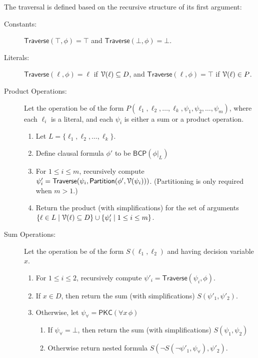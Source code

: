 \documentclass[letterpaper,USenglish,cleveref, autoref, thm-restate]{lipics-v2021}
\newcommand{\tautology}{\top}
\newcommand{\nil}{\bot}
\newcommand{\lit}{\ell}
\newcommand{\dvarset}{D}
\newcommand{\pvarset}{P}
\newcommand{\dependencyset}{{\cal V}}
\newcommand{\simplify}[2]{#1|_{#2}}
\newcommand{\ureduce}[2]{\forall #2\, #1}
\newcommand{\algo}[1]{\textsf{#1}}
\newcommand{\pkc}{\algo{PKC}}
\newcommand{\traverse}{\algo{Traverse}}
\newcommand{\bcp}{\algo{BCP}}
\newcommand{\partition}{\algo{Partition}}
\begin{document}
The traversal is defined based on the recursive structure of its first argument:
\begin{description}
\item[Constants:]
  $\traverse(\tautology, \phi) = \tautology$ and 
  $\traverse(\nil, \phi) = \nil$.

\item[Literals:]
  $\traverse(\lit, \phi) = \lit$ if $\dependencyset(\lit) \subseteq \dvarset$, and $\traverse(\lit, \phi) = \tautology$ if $\dependencyset(\lit) \in \pvarset$.
\item[Product Operations:]
  Let the operation be of the form $P(\lit_1, \lit_2, \ldots, \lit_k, \psi_1, \psi_2, \ldots, \psi_m)$, where each $\lit_i$ is a literal,
  and each $\psi_i$ is either a sum or a  product operation.
  \begin{enumerate}
  \item Let $L = \{\lit_1, \lit_2, \ldots, \lit_k\}$.
  \item Define clausal formula $\phi'$ to be $\bcp(\simplify{\phi}{L})$
  \item For $1 \leq i \leq m$, recursively compute $\psi'_i = \traverse(\psi_i, \partition(\phi', \dependencyset(\psi_i)))$.  (Partitioning is only required when $m > 1$.)
  \item Return the product (with simplifications) for the set of arguments $\{\lit \in L \mid  \dependencyset(\lit) \subseteq \dvarset\} \cup \{ \psi'_i \mid  1 \leq i \leq m \}$.
  \end{enumerate}
\item[Sum Operations:]
  Let the operation be of the form $S(\lit_1, \lit_2)$ and having decision variable $x$.
  \begin{enumerate}
  \item For $1 \leq i \leq 2$, recursively compute $\psi'_i = \traverse(\psi_i, \phi)$.
  \item If $x \in \dvarset$, then return the sum (with simplifications) $S(\psi'_1, \psi'_2)$.
  \item Otherwise, let $\psi_{\forall} = \pkc(\ureduce{\phi}{x})$
    \begin{enumerate}
    \item If $\psi_{\forall} = \nil$, then return the sum (with simplifications) $S(\psi_1, \psi_2)$
    \item Otherwise return nested formula $S(\neg S(\neg \psi'_1, \psi_{\forall}), \psi'_2)$.
    \end{enumerate}
  \end{enumerate}
\end{description}
\end{document}
